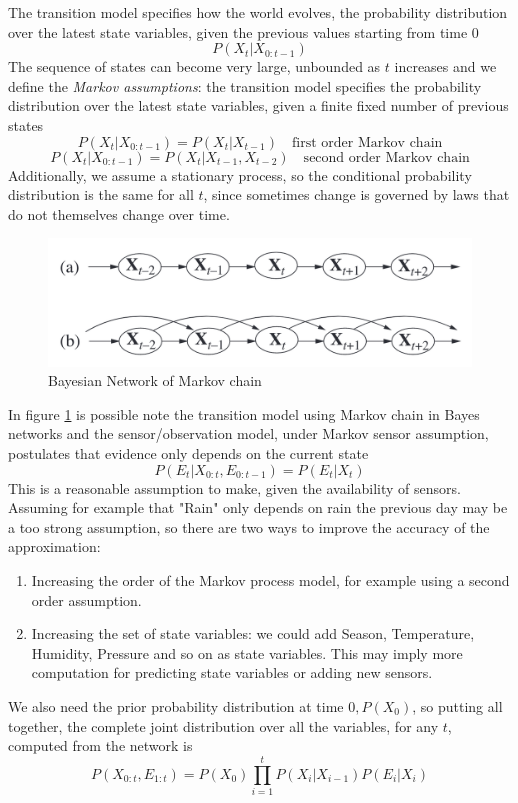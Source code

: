 The transition model specifies how the world evolves, the probability distribution over the
latest state variables, given the previous values starting from time $0$
\[ P(X_t | X_{0:t-1}) \]
The sequence of states can become very large, unbounded as $t$ increases and we define the 
\emph{Markov assumptions}: the transition model specifies the probability distribution
over the latest state variables, given a finite fixed number of previous states
\[ P(X_t | X_{0:t-1}) = P(X_t | X_{t-1}) \quad \text{first order Markov chain} \]
\[ P(X_t | X_{0:t-1}) = P(X_t | X_{t-1}, X_{t-2}) \quad \text{second order Markov chain} \]
Additionally, we assume a stationary process, so the conditional probability distribution
is the same for all $t$, since sometimes change is governed by laws that do not themselves
change over time.

\begin{figure}
	\includegraphics[width=\textwidth]{Images/bayesianMarkov}
	\caption{Bayesian Network of Markov chain}
	\label{img:bayesianMarkov}
\end{figure}
In figure \ref{img:bayesianMarkov} is possible note the transition model using Markov 
chain in Bayes networks and the sensor/observation model, under Markov sensor assumption,
postulates that evidence only depends on the current state
\[ P(E_t | X_{0:t}, E_{0:t-1}) = P(E_t | X_t) \]
This is a reasonable assumption to make, given the availability of sensors.\newline
Assuming for example that "Rain" only depends on rain the previous day may be a too strong
assumption, so there are two ways to improve the accuracy of the approximation:
\begin{enumerate}
    \item Increasing the order of the Markov process model, for example using
	  a second order assumption.
    \item Increasing the set of state variables: we could add Season, Temperature, Humidity,
          Pressure and so on as state variables.\newline
	  This may imply more computation for predicting state variables or adding new sensors.
\end{enumerate}
We also need the prior probability distribution at time $0, P(X_0)$, so putting all together,
the complete joint distribution over all the variables, for any $t$, 
computed from the network is
\[ P(X_{0:t}, E_{1:t}) = P(X_0) \prod _{i=1}^t P(X_i | X_{i-1}) P(E_i | X_i) \]

